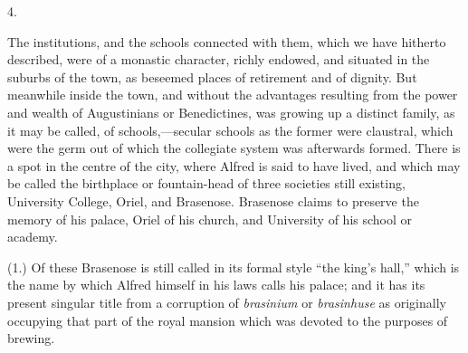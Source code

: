 4.

The institutions, and the
schools connected with them, which we have hitherto described,
were of a monastic character, richly endowed, and situated in the
suburbs of the town, as beseemed places of retirement and of dignity.
But meanwhile inside the town, and without the advantages resulting
from the power and wealth of Augustinians or Benedictines, was growing
up a distinct family, as it may be called, of schools,—secular
schools as the former were claustral, which were the germ out of which
the collegiate system was afterwards formed. There is a spot in the
centre of the city, where Alfred is said to have lived, and which may
be called the birthplace or fountain-head of three societies still
existing, University College, Oriel, and Brasenose. Brasenose claims
to preserve the memory of his palace, Oriel of his church, and
University of his school or academy.

(1.) Of these Brasenose is
still called in its formal style ``the king's hall,'' which is the name
by which Alfred himself in his laws calls his palace; and it has its
present singular title from a corruption of \emph{brasinium} or \emph{brasinhuse}
as originally occupying that part of the royal mansion which was
devoted to the purposes of brewing.

